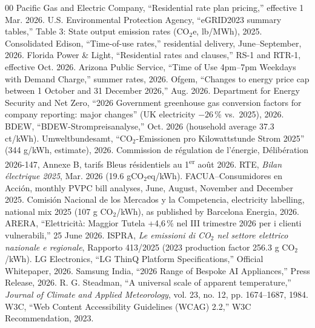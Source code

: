 \documentclass[conference]{IEEEtran}
\begin{document}
\begin{thebibliography}{00}
 Pacific Gas and Electric Company, ``Residential rate plan pricing,'' effective 1 Mar. 2026.
 U.S. Environmental Protection Agency, ``eGRID2023 summary tables,'' Table 3: State output emission rates (CO$_2$e, lb/MWh), 2025.
 Consolidated Edison, ``Time-of-use rates,'' residential delivery, June--September, 2026.
 Florida Power \& Light, ``Residential rates and clauses,'' RS-1 and RTR-1, effective Oct. 2026.
 Arizona Public Service, ``Time of Use 4pm--7pm Weekdays with Demand Charge,'' summer rates, 2026.
 Ofgem, ``Changes to energy price cap between 1 October and 31 December 2026,'' Aug. 2026.
 Department for Energy Security and Net Zero, ``2026 Government greenhouse gas conversion factors for company reporting: major changes'' (UK electricity $-26$\,\% vs.\ 2025), 2026.
 BDEW, ``BDEW-Strompreisanalyse,'' Oct. 2026 (household average 37.3 ct/kWh).
 Umweltbundesamt, ``CO$_2$-Emissionen pro Kilowattstunde Strom 2025'' (344 g/kWh, estimate), 2026.
 Commission de r\'egulation de l'\'energie, D\'elib\'eration 2026-147, Annexe B, tarifs Bleus r\'esidentiels au 1\textsuperscript{er} ao\^ut 2026.
 RTE, \emph{Bilan \'electrique 2025}, Mar. 2026 (19.6 gCO$_2$eq/kWh).
 FACUA--Consumidores en Acci\'on, monthly PVPC bill analyses, June, August, November and December 2025.
 Comisi\'on Nacional de los Mercados y la Competencia, electricity labelling, national mix 2025 (107 g CO$_2$/kWh), as published by Barcelona Energia, 2026.
 ARERA, ``Elettricit\`a: Maggior Tutela +4,6\,\% nel III trimestre 2026 per i clienti vulnerabili,'' 25 June 2026.
 ISPRA, \emph{Le emissioni di CO$_2$ nel settore elettrico nazionale e regionale}, Rapporto 413/2025 (2023 production factor 256.3 g CO$_2$/kWh).
 LG Electronics, ``LG ThinQ Platform Specifications,'' Official Whitepaper, 2026.
 Samsung India, ``2026 Range of Bespoke AI Appliances,'' Press Release, 2026.
 R. G. Steadman, ``A universal scale of apparent temperature,'' \emph{Journal of Climate and Applied Meteorology}, vol. 23, no. 12, pp. 1674--1687, 1984.
 W3C, ``Web Content Accessibility Guidelines (WCAG) 2.2,'' W3C Recommendation, 2023.
\end{thebibliography}
\end{document}
